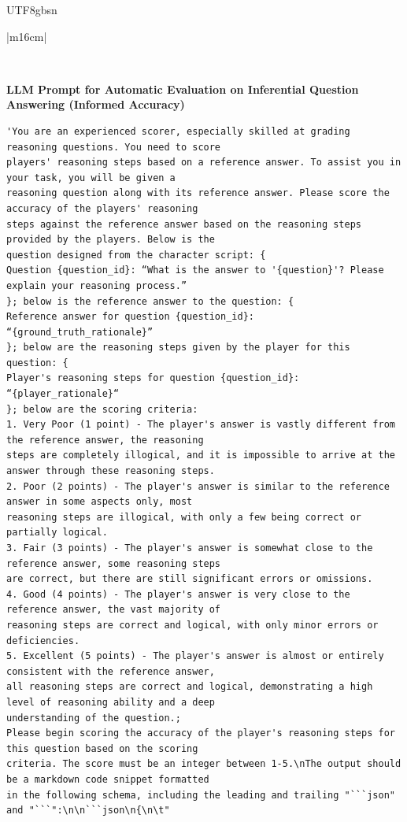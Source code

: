 \documentclass[11pt]{article}
\begin{document}
{\begin{CJK}{UTF8}{gbsn}
\begin{table}[ht!]
\begin{minipage}[t]{\linewidth}
\begin{tabular}{|m{16cm}|}
\begin{minipage}[t]{\linewidth}
\begin{verbatim}
\end{verbatim}
\end{minipage} \\
\hline
{}  {\textbf{LLM Prompt for Automatic Evaluation on Inferential Question Answering (Informed Accuracy)}} \\

\begin{minipage}[t]{\linewidth}
\small\begin{verbatim}
'You are an experienced scorer, especially skilled at grading reasoning questions. You need to score 
players' reasoning steps based on a reference answer. To assist you in your task, you will be given a 
reasoning question along with its reference answer. Please score the accuracy of the players' reasoning
steps against the reference answer based on the reasoning steps provided by the players. Below is the
question designed from the character script: {
Question {question_id}: “What is the answer to '{question}'? Please explain your reasoning process.”
}; below is the reference answer to the question: {
Reference answer for question {question_id}: “{ground_truth_rationale}”
}; below are the reasoning steps given by the player for this question: {
Player's reasoning steps for question {question_id}: “{player_rationale}“
}; below are the scoring criteria:
1. Very Poor (1 point) - The player's answer is vastly different from the reference answer, the reasoning 
steps are completely illogical, and it is impossible to arrive at the answer through these reasoning steps.
2. Poor (2 points) - The player's answer is similar to the reference answer in some aspects only, most 
reasoning steps are illogical, with only a few being correct or partially logical.
3. Fair (3 points) - The player's answer is somewhat close to the reference answer, some reasoning steps 
are correct, but there are still significant errors or omissions.
4. Good (4 points) - The player's answer is very close to the reference answer, the vast majority of 
reasoning steps are correct and logical, with only minor errors or deficiencies.
5. Excellent (5 points) - The player's answer is almost or entirely consistent with the reference answer,
all reasoning steps are correct and logical, demonstrating a high level of reasoning ability and a deep 
understanding of the question.; 
Please begin scoring the accuracy of the player's reasoning steps for this question based on the scoring
criteria. The score must be an integer between 1-5.\nThe output should be a markdown code snippet formatted
in the following schema, including the leading and trailing "```json" and "```":\n\n```json\n{\n\t"


\end{verbatim}
\end{minipage}
\end{tabular}
\end{minipage}
\end{table}
\end{CJK}}
\end{document}
